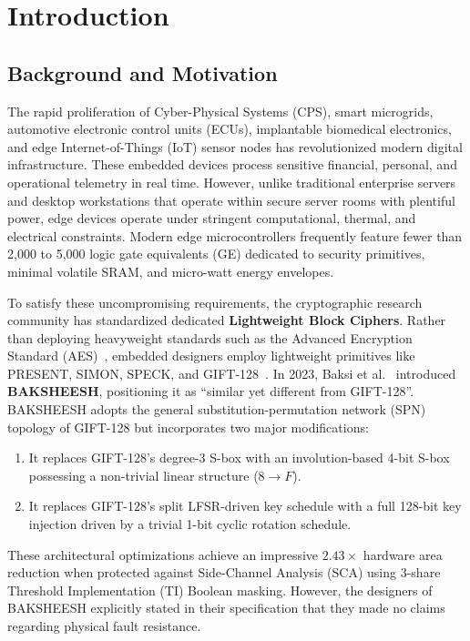 \chapter{Introduction}
\label{ch:intro}

\section{Background and Motivation}
\label{sec:background}
The rapid proliferation of Cyber-Physical Systems (CPS), smart microgrids, automotive electronic control units (ECUs), implantable biomedical electronics, and edge Internet-of-Things (IoT) sensor nodes has revolutionized modern digital infrastructure. These embedded devices process sensitive financial, personal, and operational telemetry in real time. However, unlike traditional enterprise servers and desktop workstations that operate within secure server rooms with plentiful power, edge devices operate under stringent computational, thermal, and electrical constraints. Modern edge microcontrollers frequently feature fewer than 2,000 to 5,000 logic gate equivalents (GE) dedicated to security primitives, minimal volatile SRAM, and micro-watt energy envelopes.

To satisfy these uncompromising requirements, the cryptographic research community has standardized dedicated \textbf{Lightweight Block Ciphers}. Rather than deploying heavyweight standards such as the Advanced Encryption Standard (AES)~\cite{biham1997differential}, embedded designers employ lightweight primitives like PRESENT, SIMON, SPECK, and GIFT-128~\cite{banik2017gift}. In 2023, Baksi et al.~\cite{baksi2023baksheesh} introduced \textbf{BAKSHEESH}, positioning it as ``similar yet different from GIFT-128''. BAKSHEESH adopts the general substitution-permutation network (SPN) topology of GIFT-128 but incorporates two major modifications:
\begin{enumerate}
    \item It replaces GIFT-128's degree-3 S-box with an involution-based 4-bit S-box possessing a non-trivial linear structure ($8 \to F$).
    \item It replaces GIFT-128's split LFSR-driven key schedule with a full 128-bit key injection driven by a trivial 1-bit cyclic rotation schedule.
\end{enumerate}
These architectural optimizations achieve an impressive $2.43\times$ hardware area reduction when protected against Side-Channel Analysis (SCA) using 3-share Threshold Implementation (TI) Boolean masking. However, the designers of BAKSHEESH explicitly stated in their specification that they made no claims regarding physical fault resistance.

